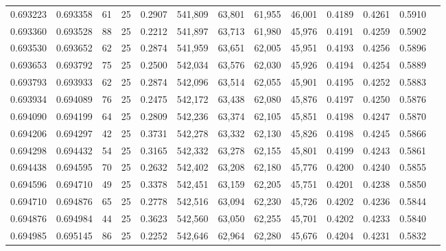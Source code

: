 \begin{tabular}{rrrrrrrrrrrrr}
0.693223 & 0.693358 &    61 &  25 &                                     0.2907 & 541,809 &  63,801 &  61,955 &  46,001 & 0.4189 & 0.4261 & 0.5910 \\
0.693360 & 0.693528 &    88 &  25 &                                     0.2212 & 541,897 &  63,713 &  61,980 &  45,976 & 0.4191 & 0.4259 & 0.5902 \\
0.693530 & 0.693652 &    62 &  25 &                                     0.2874 & 541,959 &  63,651 &  62,005 &  45,951 & 0.4193 & 0.4256 & 0.5896 \\
0.693653 & 0.693792 &    75 &  25 &                                     0.2500 & 542,034 &  63,576 &  62,030 &  45,926 & 0.4194 & 0.4254 & 0.5889 \\
0.693793 & 0.693933 &    62 &  25 &                                     0.2874 & 542,096 &  63,514 &  62,055 &  45,901 & 0.4195 & 0.4252 & 0.5883 \\
0.693934 & 0.694089 &    76 &  25 &                                     0.2475 & 542,172 &  63,438 &  62,080 &  45,876 & 0.4197 & 0.4250 & 0.5876 \\
0.694090 & 0.694199 &    64 &  25 &                                     0.2809 & 542,236 &  63,374 &  62,105 &  45,851 & 0.4198 & 0.4247 & 0.5870 \\
0.694206 & 0.694297 &    42 &  25 &                                     0.3731 & 542,278 &  63,332 &  62,130 &  45,826 & 0.4198 & 0.4245 & 0.5866 \\
0.694298 & 0.694432 &    54 &  25 &                                     0.3165 & 542,332 &  63,278 &  62,155 &  45,801 & 0.4199 & 0.4243 & 0.5861 \\
0.694438 & 0.694595 &    70 &  25 &                                     0.2632 & 542,402 &  63,208 &  62,180 &  45,776 & 0.4200 & 0.4240 & 0.5855 \\
0.694596 & 0.694710 &    49 &  25 &                                     0.3378 & 542,451 &  63,159 &  62,205 &  45,751 & 0.4201 & 0.4238 & 0.5850 \\
0.694710 & 0.694876 &    65 &  25 &                                     0.2778 & 542,516 &  63,094 &  62,230 &  45,726 & 0.4202 & 0.4236 & 0.5844 \\
0.694876 & 0.694984 &    44 &  25 &                                     0.3623 & 542,560 &  63,050 &  62,255 &  45,701 & 0.4202 & 0.4233 & 0.5840 \\
0.694985 & 0.695145 &    86 &  25 &                                     0.2252 & 542,646 &  62,964 &  62,280 &  45,676 & 0.4204 & 0.4231 & 0.5832 \\

\end{tabular}
